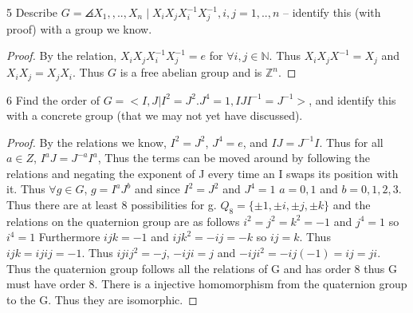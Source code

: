 \documentclass{article}
\newcommand{\Z}{\mathbb{Z}}
\newcommand{\N}{\mathbb{N}}
\begin{document}
\begin{PROB}{5}\label{Problem 5.}
    Describe $G = \angles{X_1,,..,X_n \mid X_i X_j X_i^{-1} X_j^{-1}, i,j =1,..,n}$ -- identify this (with proof) with a group we know. 
\end{PROB}
\begin{proof}
    By the relation, $X_i X_j X_i^{-1} X_j^{-1} = e$ for $\forall i, j \in \N$. Thus $X_iX_jX^{-1} = X_j$ and $X_iX_j = X_jX_i$. Thus $G$ is a free abelian group and is $\Z^n$.
\end{proof}

\bigskip

\begin{PROB}{6}\label{Problem 6.}
    Find the order of $G = <I,J| I^2=J^2. J^4=1, I J I^{-1} = J^{-1}>$, and identify this with a concrete group (that we may not yet have discussed). 
\end{PROB}
\begin{proof}
    By the relations we know, $I^2=J^2$, $J^4 = e$, and $IJ = J^{-1}I$. Thus for all $a \in Z$, $I^aJ = J^{-a}I^a$, Thus the terms can be moved around by following the relations and negating the exponent of J every time an I swaps its position with it. Thus $\forall g \in G$, $g = I^aJ^b$ and since $I^2 = J^2$ and $J^4 = 1$ $a = 0, 1$ and $b = 0, 1, 2, 3$. Thus there are at least 8 possibilities for g. $Q_8 = \{\pm 1, \pm i, \pm j, \pm k\}$ and the relations on the quaternion group are as follows $i^2 = j^2 = k^2 = -1$ and $j^4 = 1$ so $i^4 = 1$ Furthermore $ijk = -1$ and $ijk^2 = -ij = -k$ so $ij = k$. Thus $ijk = ijij = -1$. Thus $ijij^2 = -j$, $-iji = j$ and $-iji^2 = -ij(-1) = ij = ji$. Thus the quaternion group follows all the relations of G and has order 8 thus G must have order 8. There is a injective homomorphism from the quaternion group to the G. Thus they are isomorphic.
\end{proof}
\end{document}
